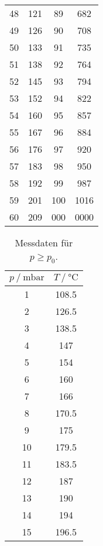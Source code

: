 \begin{table}
\begin{tabular}{S[table-format = 3.0] S[table-format = 4.0] | S[table-format = 3.0] S[table-format = 4.0]}
        48  &  121 &  89  &  682 \\
        49  &  126 &  90  &  708 \\
        50  &  133 &  91  &  735 \\
        51  &  138 &  92  &  764 \\
        52  &  145 &  93  &  794 \\
        53  &  152 &  94  &  822 \\
        54  &  160 &  95  &  857 \\
        55  &  167 &  96  &  884 \\
        56  &  176 &  97  &  920 \\
        57  &  183 &  98  &  950 \\
        58  &  192 &  99  &  987 \\
        59  &  201 &  100 & 1016 \\
        60  &  209 &  000 & 0000 \\
        \bottomrule
    \end{tabular}
\end{table}

\begin{table}
    \centering
    \caption{Messdaten für $p \geq p_0$.}
    \label{tab:Mess2}
    \begin{tabular}{S[table-format = 2.0] S[table-format = 3.1]}
        \toprule
        {$p \mathbin{/} \unit{\milli\bar}$} & {$T \mathbin{/} \unit{\degreeCelsius}$} \\
         & 108.5 \\
        2 & 126.5 \\
        3 & 138.5 \\
        4 & 147   \\
        5 & 154   \\
        6 & 160   \\
        7 & 166   \\
        8 & 170.5 \\
        9 & 175   \\
       10 & 179.5 \\
       11 & 183.5 \\
       12 & 187   \\
       13 & 190   \\
       14 & 194   \\
       15 & 196.5 \\
       \bottomrule
    \end{tabular}   
\end{table}
